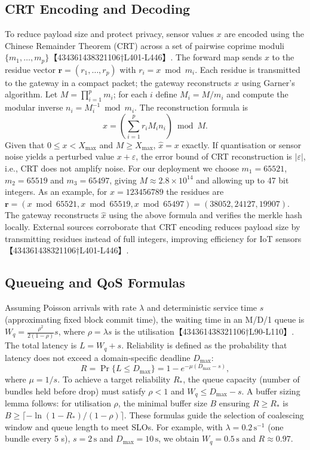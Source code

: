 \subsection{CRT Encoding and Decoding}
To reduce payload size and protect privacy, sensor values \(x\) are encoded using the
Chinese Remainder Theorem (CRT) across a set of pairwise coprime moduli
\(\{m_1,\ldots,m_p\}\)【434361438321106†L401-L446】.  The forward map sends \(x\) to the residue
vector \(\mathbf{r}=(r_1,\ldots,r_p)\) with \(r_i = x \bmod m_i\).  Each residue is transmitted
to the gateway in a compact packet; the gateway reconstructs \(x\) using Garner’s algorithm.
Let \(M=\prod_{i=1}^p m_i\); for each \(i\) define \(M_i=M/m_i\) and compute the modular
inverse \(n_i = M_i^{-1} \bmod m_i\).  The reconstruction formula is
\begin{equation}
\hat{x} = \left(\sum_{i=1}^p r_i M_i n_i\right) \bmod M.
\end{equation}
Given that \(0 \le x < X_{\max}\) and \(M \ge X_{\max}\), \(\hat{x}=x\) exactly.  If
quantisation or sensor noise yields a perturbed value \(x + \varepsilon\), the error bound
of CRT reconstruction is \(|\varepsilon|\), i.e., CRT does not amplify noise.  For our
deployment we choose \(m_1=65521\), \(m_2=65519\) and \(m_3=65497\), giving \(M\approx2.8\times10^{14}\)
and allowing up to 47 bit integers.  As an example, for \(x=123456789\) the residues are
\(\mathbf{r}=(x\bmod65521, x\bmod65519, x\bmod65497)=(38052, 24127, 19907)\).  The gateway
reconstructs \(\hat{x}\) using the above formula and verifies the merkle hash locally.
External sources corroborate that CRT encoding reduces payload size by transmitting
residues instead of full integers, improving efficiency for IoT sensors【434361438321106†L401-L446】.

\subsection{Queueing and QoS Formulas}
Assuming Poisson arrivals with rate \(\lambda\) and deterministic service time \(s\)
(approximating fixed block commit time), the waiting time in an M/D/1 queue is
\(W_q = \frac{\rho^2}{2(1-\rho)}s\), where \(\rho=\lambda s\) is the utilisation【434361438321106†L90-L110】.
The total latency is \(L = W_q + s\).  Reliability is defined as the probability that
latency does not exceed a domain‑specific deadline \(D_{\max}\):
\begin{equation}
R = \Pr\{L \le D_{\max}\} = 1 - e^{-\mu (D_{\max}-s)},
\end{equation}
where \(\mu=1/s\).  To achieve a target reliability \(R_\ast\), the queue capacity (number
of bundles held before drop) must satisfy \(\rho < 1\) and \(W_q \le D_{\max} - s\).
A buffer sizing lemma follows: for utilisation \(\rho\), the minimal buffer size \(B\)
ensuring \(R \ge R_\ast\) is \(B \ge \lceil -\ln(1-R_\ast)/(1-\rho)\rceil\).  These formulas
guide the selection of coalescing window and queue length to meet SLOs.  For example,
with \(\lambda=0.2\,\text{s}^{-1}\) (one bundle every 5 s), \(s=2\,\text{s}\) and
\(D_{\max}=10\,\text{s}\), we obtain \(W_q=0.5\,\text{s}\) and \(R\approx0.97\).

